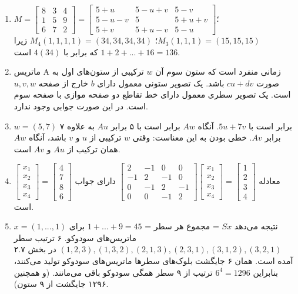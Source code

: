 \documentclass[12pt]{article}
\begin{document}
\begin{enumerate}
		\item $M= \begin{bmatrix} 8 & 3 & 4 \\ 1 & 5 & 9 \\ 6 & 7 & 2 \end{bmatrix} = \begin{bmatrix} 5+u & 5-u+v & 5-v \\ 5-u-v & 5 & 5+u+v \\ 5+v & 5+u-v & 5-u \end{bmatrix}$؛ $M_3(1,1,1)=(15,15,15)$؛ $M_4(1,1,1,1)=(34,34,34,34)$ زیرا $1+2+...+16=136$ که برابر با $4(34)$ است.
		
		\item ماتریس A زمانی منفرد است که ستون سوم آن $w$ ترکیبی از ستون‌های اول به صورت $cu+dv$ باشد. یک تصویر ستونی معمول دارای $b$ خارج از صفحه $u,v,w$ است. یک تصویر سطری معمول دارای خط تقاطع دو صفحه موازی با صفحه سوم است. در این صورت جوابی وجود ندارد.
		
		\item $w=(5,7)$ برابر است با $5u+7v$. آنگاه $Aw$ برابر است با ۵ برابر $Au$ به علاوه ۷ برابر $Av$. خطی بودن به این معناست: وقتی $w$ ترکیبی از $u$ و $v$ باشد، آنگاه $Aw$ همان ترکیب از $Au$ و $Av$ است.
		
		\item معادله $\begin{bmatrix} 2 & -1 & 0 & 0 \\ -1 & 2 & -1 & 0 \\ 0 & -1 & 2 & -1 \\ 0 & 0 & -1 & 2 \end{bmatrix} \begin{bmatrix} x_1 \\ x_2 \\ x_3 \\ x_4 \end{bmatrix} = \begin{bmatrix} 1 \\ 2 \\ 3 \\ 4 \end{bmatrix}$ دارای جواب $\begin{bmatrix} x_1 \\ x_2 \\ x_3 \\ x_4 \end{bmatrix} = \begin{bmatrix} 4 \\ 7 \\ 8 \\ 6 \end{bmatrix}$ است.
		
		\item $x=(1,...,1)$ نتیجه می‌دهد $Sx$ = مجموع هر سطر = $1+...+9=45$ برای ماتریس‌های سودوکو. ۶ ترتیب سطر $(1,2,3), (1,3,2), (2,1,3), (2,3,1), (3,1,2), (3,2,1)$ در بخش ۲.۷ آمده است. همان ۶ جایگشت بلوک‌های سطرها ماتریس‌های سودوکو تولید می‌کنند، بنابراین $6^4=1296$ ترتیب از ۹ سطر همگی سودوکو باقی می‌مانند. (و همچنین ۱۲۹۶ جایگشت از ۹ ستون).
		
	\end{enumerate}
	
\end{document}
